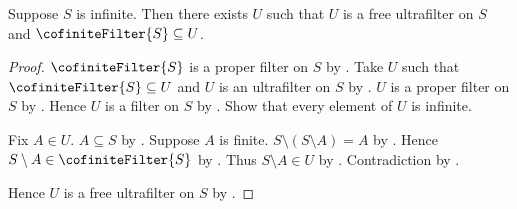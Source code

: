 \begin{theorem}\label{free_ultrafilter_exists}
    Suppose $S$ is infinite.
    Then there exists $U$ such that $U$ is a free ultrafilter on $S$ and
        $\cofiniteFilter{S}\subseteq U$.
\end{theorem}
\begin{proof}
    $\cofiniteFilter{S}$ is a proper filter on $S$
        by .
    Take $U$ such that $\cofiniteFilter{S}\subseteq U$ and
        $U$ is an ultrafilter on $S$
        by .
    $U$ is a proper filter on $S$ by .
    Hence $U$ is a filter on $S$ by .
    Show that every element of $U$ is infinite.
    \begin{subproof}
        Fix $A\in U$.
        $A\subseteq S$ by .
        Suppose $A$ is finite.
        $S\setminus(S\setminus A)=A$
            by .
        Hence $S\setminus A\in\cofiniteFilter{S}$
            by .
        Thus $S\setminus A\in U$ by .
        Contradiction by .
    \end{subproof}
    Hence $U$ is a free ultrafilter on $S$ by .
\end{proof}
